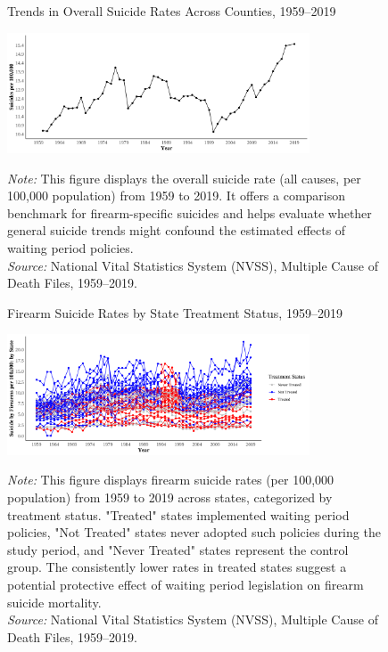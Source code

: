 \pagebreak
\clearpage

\begin{figure}[htbp]
    \centering
    \caption{Trends in Overall Suicide Rates Across Counties, 1959–2019}
    \includegraphics[width=0.8\textwidth]{figures/06-suicide_byyear_popcont.png}
    \label{fig:06-suicide_byyear_popcont}

    \begin{minipage}{\linewidth}
    \caption*{\footnotesize{
      \noindent\textit{Note:} This figure displays the overall suicide rate (all causes, per 100,000 population) from 1959 to 2019. It offers a comparison benchmark for firearm-specific suicides and helps evaluate whether general suicide trends might confound the estimated effects of waiting period policies.\\
    \noindent\textit{Source:} National Vital Statistics System (NVSS), Multiple Cause of Death Files, 1959–2019.
    }}
  \end{minipage}
\end{figure}

\pagebreak
\clearpage

\begin{figure}[htbp]
    \centering
    \caption{Firearm Suicide Rates by State Treatment Status, 1959–2019}
    \includegraphics[width=0.8\textwidth]{figures/01-suicide_firearm_byyearbystate.png}
    \label{fig:01-suicide_firearm_byyearbystat}

    \begin{minipage}{\linewidth}
    \caption*{\footnotesize{
      \noindent\textit{Note:} This figure displays firearm suicide rates (per 100,000 population) from 1959 to 2019 across states, categorized by treatment status. "Treated" states implemented waiting period policies, "Not Treated" states never adopted such policies during the study period, and "Never Treated" states represent the control group. The consistently lower rates in treated states suggest a potential protective effect of waiting period legislation on firearm suicide mortality. \\
    \noindent\textit{Source:} National Vital Statistics System (NVSS), Multiple Cause of Death Files, 1959–2019.
    }}
  \end{minipage}
\end{figure}

